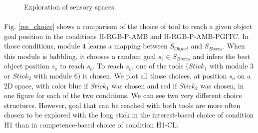 \documentclass[10pt,letterpaper]{article}
\begin{document}
\begin{figure}[ht]
		\caption{Exploration of sensory spaces.}
		\label{res_explo}
	\end{figure}


	\paragraph{}
	Fig. \ref{res_choice} shows a comparison of the choice of tool to reach a given object goal position in the conditions H-RGB-P-AMB and H-RGB-P-AMB-PGITC.
	In those conditions, module $4$ learns a mapping between $S_{Object}$ and $S_{Boxes}$. 
	When this module is babbling, it chooses a random goal $s_b \in S_{Boxes}$ and infers the best object position $s_o$ to reach $s_b$.
	To reach $s_o$, one of the tools ($Stick_1$ with module $3$ or $Stick_2$ with module $6$) is chosen. 
	We plot all those choices, at position $s_o$ on a $2$D space, with color blue if $Stick_1$ was chosen and red if $Stick_2$ was chosen, in one figure for each of the two conditions.
	We can see two very different choice structures.
	However, goal that can be reached with both tools are more often chosen to be explored with the long stick in the interest-based choice of condition H1 than in competence-based choice of condition H1-CL.
	
\end{document}
